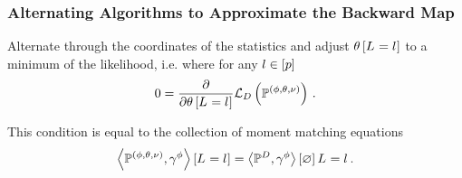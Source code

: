 \subsubsection{Alternating Algorithms to Approximate the Backward Map}\label{sec:alternatingBackwardMap}




Alternate through the coordinates of the statistics and adjust $\theta\left[L_{}=l_{}\right]$ to a minimum of the likelihood, i.e. where for any $l\in[p]$
\begin{align*}
	0 = \frac{\partial}{\partial \theta\left[L_{}=l_{}\right]} \mathcal{L}_{D}\left(\mathbb{P}^{(\phi,\theta,\nu)}\right) \, . 
\end{align*}

This condition is equal to the collection of moment matching equations %
\begin{align*}
	\left\langle \mathbb{P}^{(\phi,\theta,\nu)},\gamma^{\phi}\right\rangle \left[ L_{}=l_{} \right] = \left\langle \mathbb{P}^{D},\gamma^{\phi}\right\rangle \left[ \varnothing \right]{L_{}=l_{}} \, . 
\end{align*}


